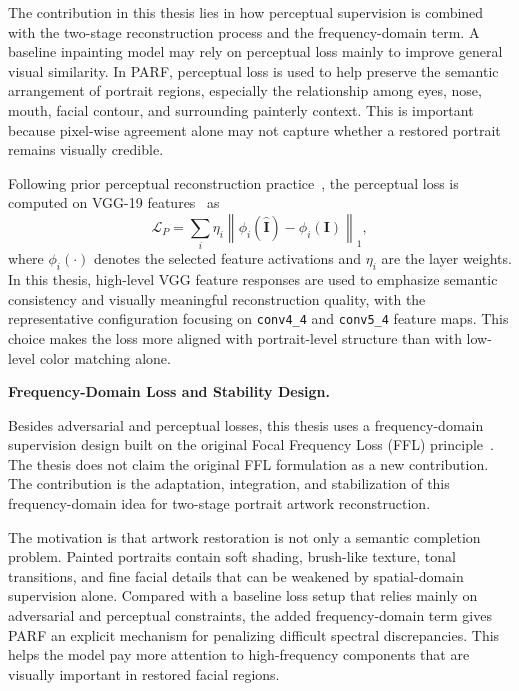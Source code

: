 \documentclass[12pt, twoside]{report}
\begin{document}
The contribution in this thesis lies in how perceptual supervision is combined with the two-stage reconstruction process and the frequency-domain term. A baseline inpainting model may rely on perceptual loss mainly to improve general visual similarity. In PARF, perceptual loss is used to help preserve the semantic arrangement of portrait regions, especially the relationship among eyes, nose, mouth, facial contour, and surrounding painterly context. This is important because pixel-wise agreement alone may not capture whether a restored portrait remains visually credible.

Following prior perceptual reconstruction practice~\cite{johnson2016perceptual}, the perceptual loss is computed on VGG-19 features~\cite{simonyan2015vgg} as
\begin{equation}
\mathcal{L}_{P} = \sum_{i}\eta_i \left\|\phi_i(\hat{\mathbf{I}})-\phi_i(\mathbf{I})\right\|_1,
\end{equation}
where $\phi_i(\cdot)$ denotes the selected feature activations and $\eta_i$ are the layer weights. In this thesis, high-level VGG feature responses are used to emphasize semantic consistency and visually meaningful reconstruction quality, with the representative configuration focusing on \texttt{conv4\_4} and \texttt{conv5\_4} feature maps. This choice makes the loss more aligned with portrait-level structure than with low-level color matching alone.

\vspace{0.35\baselineskip}
\noindent\textbf{Frequency-Domain Loss and Stability Design.}\par

Besides adversarial and perceptual losses, this thesis uses a frequency-domain supervision design built on the original Focal Frequency Loss (FFL) principle~\cite{jiang2021ffl}. The thesis does not claim the original FFL formulation as a new contribution. The contribution is the adaptation, integration, and stabilization of this frequency-domain idea for two-stage portrait artwork reconstruction.

The motivation is that artwork restoration is not only a semantic completion problem. Painted portraits contain soft shading, brush-like texture, tonal transitions, and fine facial details that can be weakened by spatial-domain supervision alone. Compared with a baseline loss setup that relies mainly on adversarial and perceptual constraints, the added frequency-domain term gives PARF an explicit mechanism for penalizing difficult spectral discrepancies. This helps the model pay more attention to high-frequency components that are visually important in restored facial regions.
\end{document}
